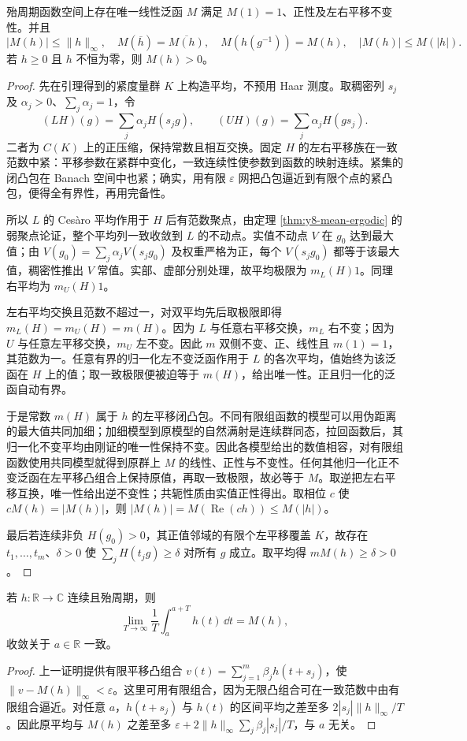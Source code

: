 \begin{theorem}[唯一的双侧不变平均]\label{thm:y8-ap-mean}
殆周期函数空间上存在唯一线性泛函 $M$ 满足 $M(1)=1$、正性及左右平移不变性。并且
\[
 |M(h)|\le\|h\|_\infty,\quad M(\overline h)=\overline{M(h)},\quad
 M(h(g^{-1}))=M(h),\quad |M(h)|\le M(|h|).
\]
若 $h\ge0$ 且 $h$ 不恒为零，则 $M(h)>0$。
\end{theorem}
\begin{proof}
先在引理得到的紧度量群 $K$ 上构造平均，不预用 Haar 测度。取稠密列 $s_j$ 及 $\alpha_j>0$、$\sum_j\alpha_j=1$，令
\[
 (LH)(g)=\sum_j\alpha_jH(s_jg),\qquad
 (UH)(g)=\sum_j\alpha_jH(gs_j).
\]
二者为 $C(K)$ 上的正压缩，保持常数且相互交换。固定 $H$ 的左右平移族在一致范数中紧：平移参数在紧群中变化，一致连续性使参数到函数的映射连续。紧集的闭凸包在 Banach 空间中也紧；确实，用有限 $\varepsilon$ 网把凸包逼近到有限个点的紧凸包，便得全有界性，再用完备性。

所以 $L$ 的 Ces\`aro 平均作用于 $H$ 后有范数聚点，由定理 \ref{thm:y8-mean-ergodic} 的弱聚点论证，整个平均列一致收敛到 $L$ 的不动点。实值不动点 $V$ 在 $g_0$ 达到最大值；由
$V(g_0)=\sum_j\alpha_jV(s_jg_0)$ 及权重严格为正，每个 $V(s_jg_0)$ 都等于该最大值，稠密性推出 $V$ 常值。实部、虚部分别处理，故平均极限为 $m_L(H)1$。同理右平均为 $m_U(H)1$。

左右平均交换且范数不超过一，对双平均先后取极限即得 $m_L(H)=m_U(H)=m(H)$。因为 $L$ 与任意右平移交换，$m_L$ 右不变；因为 $U$ 与任意左平移交换，$m_U$ 左不变。因此 $m$ 双侧不变、正、线性且 $m(1)=1$，其范数为一。任意有界的归一化左不变泛函作用于 $L$ 的各次平均，值始终为该泛函在 $H$ 上的值；取一致极限便被迫等于 $m(H)$，给出唯一性。正且归一化的泛函自动有界。

于是常数 $m(H)$ 属于 $h$ 的左平移闭凸包。不同有限组函数的模型可以用伪距离的最大值共同加细；加细模型到原模型的自然满射是连续群同态，拉回函数后，其归一化不变平均由刚证的唯一性保持不变。因此各模型给出的数值相容，对有限组函数使用共同模型就得到原群上 $M$ 的线性、正性与不变性。任何其他归一化正不变泛函在左平移凸组合上保持原值，再取一致极限，故必等于 $M$。取逆把左右平移互换，唯一性给出逆不变性；共轭性质由实值正性得出。取相位 $c$ 使 $cM(h)=|M(h)|$，则
$|M(h)|=M(\operatorname{Re}(ch))\le M(|h|)$。

最后若连续非负 $H(g_0)>0$，其正值邻域的有限个左平移覆盖 $K$，故存在 $t_1,\ldots,t_m$、$\delta>0$ 使 $\sum_jH(t_jg)\ge\delta$ 对所有 $g$ 成立。取平均得 $mM(h)\ge\delta>0$。
\end{proof}

\begin{proposition}[实直线上的区间平均]\label{prop:y8-real-mean}
若 $h:\mathbb R\to\mathbb C$ 连续且殆周期，则
\[
 \lim_{T\to\infty}\frac1T\int_a^{a+T}h(t)\,\dd t=M(h),
\]
收敛关于 $a\in\mathbb R$ 一致。
\end{proposition}
\begin{proof}
上一证明提供有限平移凸组合 $v(t)=\sum_{j=1}^m\beta_jh(t+s_j)$，使 $\|v-M(h)\|_\infty<\varepsilon$。这里可用有限组合，因为无限凸组合可在一致范数中由有限组合逼近。对任意 $a$，$h(t+s_j)$ 与 $h(t)$ 的区间平均之差至多 $2|s_j|\|h\|_\infty/T$。因此原平均与 $M(h)$ 之差至多
$\varepsilon+2\|h\|_\infty\sum_j\beta_j|s_j|/T$，与 $a$ 无关。
\end{proof}

